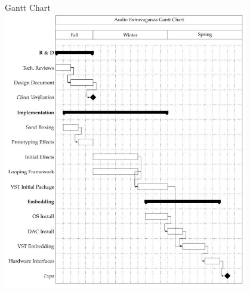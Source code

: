 \documentclass[onecolumn, draftclsnofoot,10pt, compsoc]{IEEEtran}
\begin{document}


\clearpage



% 
% 


\newpage
Gantt Chart\\
\includegraphics[width=0.8\textwidth]{./gantt.JPG}
%
\newpage


\end{document}

